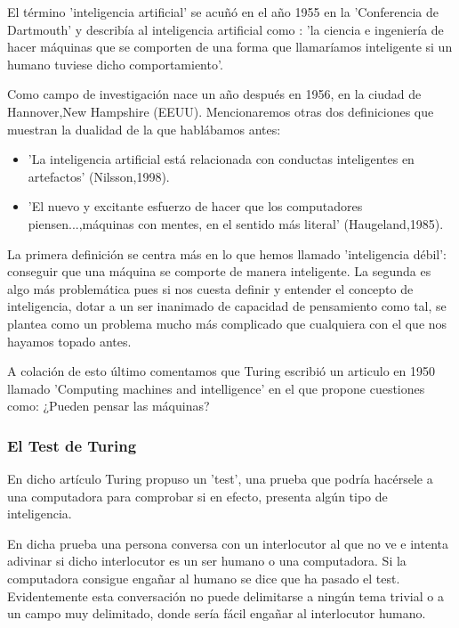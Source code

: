 \vspace{10px}


El término 'inteligencia artificial' se acuñó en el año 1955 en la 'Conferencia de Dartmouth' y describía al inteligencia artificial como : 'la ciencia e ingeniería de hacer máquinas que se comporten de una forma que llamaríamos inteligente si un humano tuviese dicho comportamiento'.

\vspace{10px} 

Como campo de investigación nace un año después en 1956, en la ciudad de Hannover,New Hampshire (EEUU). Mencionaremos otras dos definiciones que muestran la dualidad de la que hablábamos antes:

\begin{itemize}
	\item 'La inteligencia artificial está relacionada con conductas inteligentes en artefactos' (Nilsson,1998).
	\item 'El nuevo y excitante esfuerzo de hacer que los computadores piensen...,máquinas con mentes, en el sentido más literal' (Haugeland,1985).
\end{itemize}

La primera definición se centra más en lo que hemos llamado 'inteligencia débil': conseguir que una máquina se comporte de manera inteligente. La segunda es algo más problemática pues si nos cuesta definir y entender el concepto de inteligencia, dotar a un ser inanimado de capacidad de pensamiento como tal, se plantea como un problema mucho más complicado que cualquiera con el que nos hayamos topado antes.

\vspace{10px}

A colación de esto último comentamos que Turing escribió un articulo en 1950 llamado 'Computing machines and intelligence' en el que propone cuestiones como: ¿Pueden pensar las máquinas?


\subsubsection{El Test de Turing}

En dicho artículo Turing propuso un 'test', una prueba que podría hacérsele a una computadora para comprobar si en efecto, presenta algún tipo de inteligencia.

\vspace{10px}

En dicha prueba una persona conversa con un interlocutor al que no ve e intenta adivinar si dicho interlocutor es un ser humano o una computadora. Si la computadora consigue engañar al humano se dice que ha pasado el test. Evidentemente esta conversación no puede delimitarse a ningún tema trivial o a un campo muy delimitado, donde sería fácil engañar al interlocutor humano.

